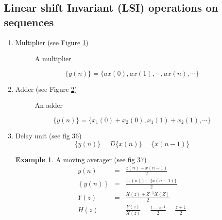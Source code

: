 \documentclass[11pt]{article} %
\theoremstyle{definition}
\newtheorem{example}{Example}[subsection]
\begin{document}
\subsection{Linear shift Invariant (LSI) operations on sequences}
\begin{enumerate}

\item Multiplier (see Figure \ref{fig:multiplier})
	\begin{figure}[h]
		\centering
		\caption{A multiplier}
		\label{fig:multiplier}
	\end{figure}

\begin{equation}
	\{y(n)\} = \{ a x(0), ax(1), \cdots, ax(n), \cdots \}
\end{equation}

\item Adder (see Figure \ref{fig:adder})
	\begin{figure}[h]
		\centering
		\caption{An adder}
		\label{fig:adder}
	\end{figure}

\begin{equation}
	\{y(n)\} = \{ x_1(0)+x_2(0),x_1(1)+x_2(1), \cdots\}
\end{equation}

\item Delay unit (see fig 36)
\begin{equation}
	\{y(n)\} = D\{x(n)\}=\{x(n-1)\}
\end{equation}
\begin{example}
	A moving averager (see fig 37)
\begin{eqnarray}
	y(n) &=& \frac{z(n)+x(n-1)}{2} \nonumber \\
	\left\{y(n)\right\} &=& \frac{\{z(n)\}+\{x(n-1)\}}{2} \nonumber \\
	Y(z) &=& \frac{X(z)+Z^{-1}X(Z)}{2} \nonumber \\
	H(z) &=& \frac{Y(z)}{X(z)} = \frac{1-z^{-1}}{2} = \frac {z+1}{2}
\end{eqnarray}
\end{example}
\end{enumerate}
\end{document}
